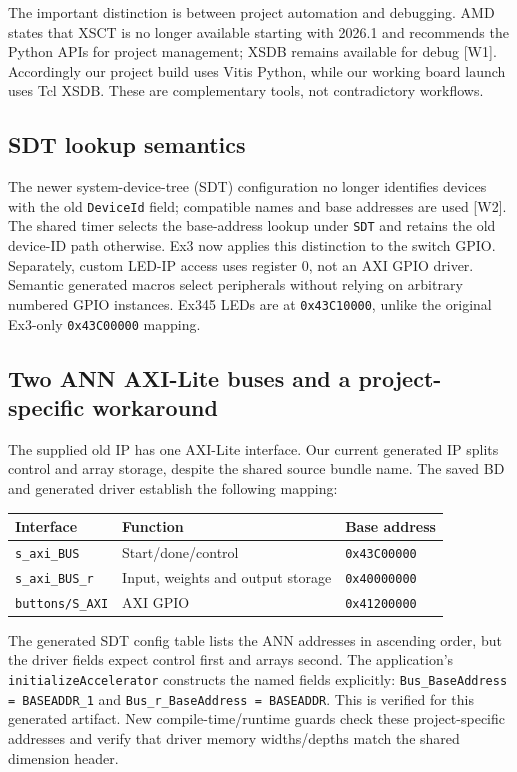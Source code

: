\documentclass[11pt,a4paper]{article}
\begin{document}
The important distinction is between project automation and debugging.
AMD states that XSCT is no longer available starting with 2026.1 and recommends
the Python APIs for project management; XSDB remains available for debug [W1].
Accordingly our project build uses Vitis Python, while our working board launch
uses Tcl XSDB. These are complementary tools, not contradictory workflows.

\subsection*{SDT lookup semantics}
The newer system-device-tree (SDT) configuration no longer identifies devices
with the old \texttt{DeviceId} field; compatible names and base addresses are
used [W2]. The shared timer selects the base-address lookup under \texttt{SDT}
and retains the old device-ID path otherwise. Ex3 now applies this distinction
to the switch GPIO. Separately, custom LED-IP access uses register 0, not an
AXI GPIO driver. Semantic generated macros select peripherals without relying
on arbitrary numbered GPIO instances. Ex345 LEDs are at \texttt{0x43C10000},
unlike the original Ex3-only \texttt{0x43C00000} mapping.

\subsection*{Two ANN AXI-Lite buses and a project-specific workaround}
The supplied old IP has one AXI-Lite interface. Our current generated IP splits
control and array storage, despite the shared source bundle name. The saved
BD and generated driver establish the following mapping:

\begin{center}
\begin{tabular}{lll}
\toprule Interface & Function & Base address \\
\midrule
\texttt{s\_axi\_BUS} & Start/done/control & \texttt{0x43C00000} \\
\texttt{s\_axi\_BUS\_r} & Input, weights and output storage & \texttt{0x40000000} \\
\texttt{buttons/S\_AXI} & AXI GPIO & \texttt{0x41200000} \\
\bottomrule
\end{tabular}
\end{center}
The generated SDT config table lists the ANN addresses in ascending order,
but the driver fields expect control first and arrays second. The application's
\texttt{initializeAccelerator} constructs the named fields explicitly:
\texttt{Bus\_BaseAddress = BASEADDR\_1} and
\texttt{Bus\_r\_BaseAddress = BASEADDR}. This is verified for this generated
artifact. New compile-time/runtime guards check these project-specific addresses
and verify that driver memory widths/depths match the shared dimension header.
\end{document}
